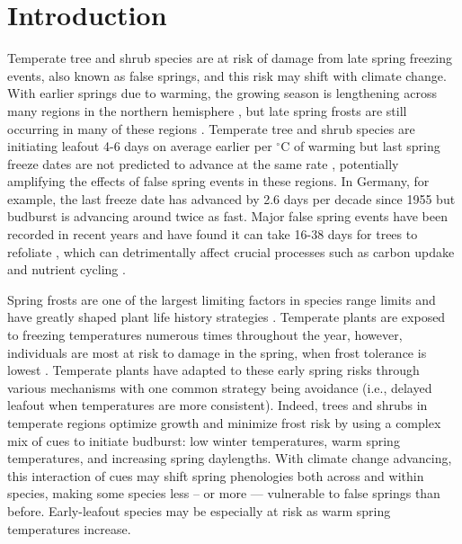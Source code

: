 \documentclass{article}\usepackage[]{graphicx}\usepackage[]{color}
\begin{document}
\section*{Introduction}
Temperate tree and shrub species are at risk of damage from late spring freezing events, also known as false springs, and this risk may shift with climate change. With earlier springs due to warming, the growing season is lengthening across many regions in the northern hemisphere \citep{Chen2005, Kukal2018, Liu2006}, but late spring frosts are still occurring in many of these regions \citep{Wypych2016a}. Temperate tree and shrub species are initiating leafout 4-6 days on average earlier per $^{\circ}$C of warming \citep{IPCC2014, Wolkovich2012} but last spring freeze dates are not predicted to advance at the same rate \citep{Inouye2008, Labe2016, Martin2010, Sgubin2018}, potentially amplifying the effects of false spring events in these regions. In Germany, for example, the last freeze date has advanced by 2.6 days per decade since 1955 \citep{Zohner2016} but budburst is advancing around twice as fast. Major false spring events have been recorded in recent years and have found it can take 16-38 days for trees to refoliate \citep{Augspurger2009, Augspurger2013, Gu2008, Menzel2015}, which can detrimentally affect crucial processes such as carbon updake and nutrient cycling \citep{Hufkens2012, Klosterman2018, Richardson2013}.

Spring frosts are one of the largest limiting factors in species range limits and have greatly shaped plant life history strategies \citep{Kollas2014}. Temperate plants are exposed to freezing temperatures numerous times throughout the year, however, individuals are most at risk to damage in the spring, when frost tolerance is lowest \citep{Sakai1987}. Temperate plants have adapted to these early spring risks through various mechanisms with one common strategy being avoidance (i.e., delayed leafout when temperatures are more consistent). Indeed, trees and shrubs in temperate regions optimize growth and minimize frost risk by using a complex mix of cues to initiate budburst: low winter temperatures, warm spring temperatures, and increasing spring daylengths. With climate change advancing, this interaction of cues may shift spring phenologies both across and within species, making some species less -- or more --- vulnerable to false springs than before. Early-leafout species may be especially at risk as warm spring temperatures increase.
 
\end{document}
